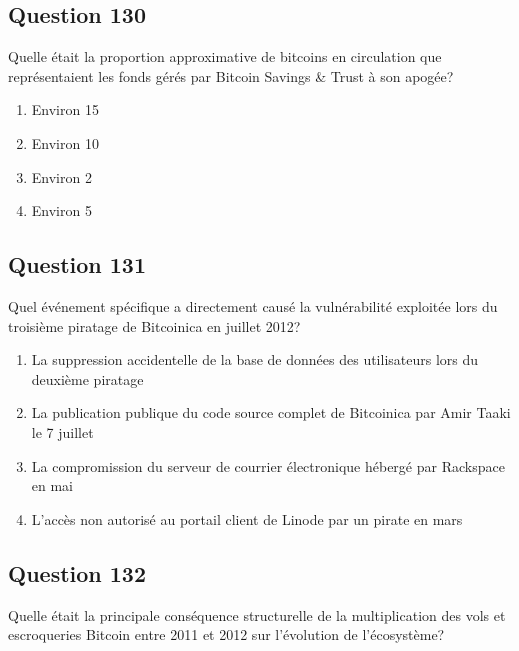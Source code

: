 \documentclass[12pt,a4paper]{article}
\begin{document}
\bigskip


\subsection*{Question 130}
Quelle était la proportion approximative de bitcoins en circulation que représentaient les fonds gérés par Bitcoin Savings & Trust à son apogée?

\begin{enumerate}[label=\Alph*., leftmargin=*]
\item Environ 15%
\item Environ 10%
\item Environ 2%
\item Environ 5%
\end{enumerate}

\bigskip


\subsection*{Question 131}
Quel événement spécifique a directement causé la vulnérabilité exploitée lors du troisième piratage de Bitcoinica en juillet 2012?

\begin{enumerate}[label=\Alph*., leftmargin=*]
\item La suppression accidentelle de la base de données des utilisateurs lors du deuxième piratage
\item La publication publique du code source complet de Bitcoinica par Amir Taaki le 7 juillet
\item La compromission du serveur de courrier électronique hébergé par Rackspace en mai
\item L'accès non autorisé au portail client de Linode par un pirate en mars
\end{enumerate}

\bigskip


\subsection*{Question 132}
Quelle était la principale conséquence structurelle de la multiplication des vols et escroqueries Bitcoin entre 2011 et 2012 sur l'évolution de l'écosystème?
\end{document}
